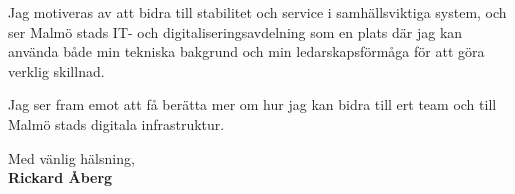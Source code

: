 \documentclass[11pt,a4paper]{article}
\begin{document}
Jag motiveras av att bidra till stabilitet och service i samhällsviktiga system, och ser Malmö stads IT- och digitaliseringsavdelning som en plats där jag kan använda både min tekniska bakgrund och min ledarskapsförmåga för att göra verklig skillnad.

Jag ser fram emot att få berätta mer om hur jag kan bidra till ert team och till Malmö stads digitala infrastruktur.

\vspace{2em}
Med vänlig hälsning, \\[1em]
\textbf{Rickard Åberg}
\end{document}
